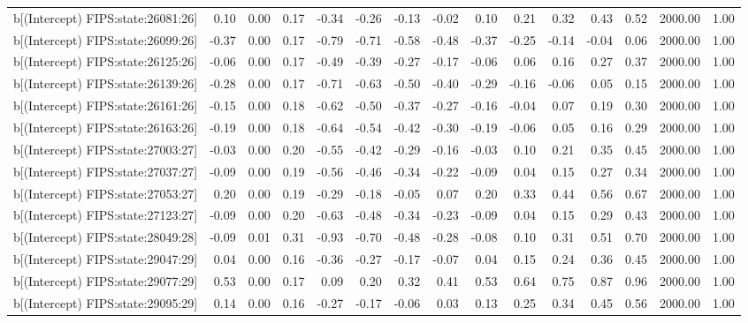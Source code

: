 \begin{table}[ht]
\begin{tabular}{rrrrrrrrrrrrrrr}
  b[(Intercept) FIPS:state:26081:26] & 0.10 & 0.00 & 0.17 & -0.34 & -0.26 & -0.13 & -0.02 & 0.10 & 0.21 & 0.32 & 0.43 & 0.52 & 2000.00 & 1.00 \\ 
  b[(Intercept) FIPS:state:26099:26] & -0.37 & 0.00 & 0.17 & -0.79 & -0.71 & -0.58 & -0.48 & -0.37 & -0.25 & -0.14 & -0.04 & 0.06 & 2000.00 & 1.00 \\ 
  b[(Intercept) FIPS:state:26125:26] & -0.06 & 0.00 & 0.17 & -0.49 & -0.39 & -0.27 & -0.17 & -0.06 & 0.06 & 0.16 & 0.27 & 0.37 & 2000.00 & 1.00 \\ 
  b[(Intercept) FIPS:state:26139:26] & -0.28 & 0.00 & 0.17 & -0.71 & -0.63 & -0.50 & -0.40 & -0.29 & -0.16 & -0.06 & 0.05 & 0.15 & 2000.00 & 1.00 \\ 
  b[(Intercept) FIPS:state:26161:26] & -0.15 & 0.00 & 0.18 & -0.62 & -0.50 & -0.37 & -0.27 & -0.16 & -0.04 & 0.07 & 0.19 & 0.30 & 2000.00 & 1.00 \\ 
  b[(Intercept) FIPS:state:26163:26] & -0.19 & 0.00 & 0.18 & -0.64 & -0.54 & -0.42 & -0.30 & -0.19 & -0.06 & 0.05 & 0.16 & 0.29 & 2000.00 & 1.00 \\ 
  b[(Intercept) FIPS:state:27003:27] & -0.03 & 0.00 & 0.20 & -0.55 & -0.42 & -0.29 & -0.16 & -0.03 & 0.10 & 0.21 & 0.35 & 0.45 & 2000.00 & 1.00 \\ 
  b[(Intercept) FIPS:state:27037:27] & -0.09 & 0.00 & 0.19 & -0.56 & -0.46 & -0.34 & -0.22 & -0.09 & 0.04 & 0.15 & 0.27 & 0.34 & 2000.00 & 1.00 \\ 
  b[(Intercept) FIPS:state:27053:27] & 0.20 & 0.00 & 0.19 & -0.29 & -0.18 & -0.05 & 0.07 & 0.20 & 0.33 & 0.44 & 0.56 & 0.67 & 2000.00 & 1.00 \\ 
  b[(Intercept) FIPS:state:27123:27] & -0.09 & 0.00 & 0.20 & -0.63 & -0.48 & -0.34 & -0.23 & -0.09 & 0.04 & 0.15 & 0.29 & 0.43 & 2000.00 & 1.00 \\ 
  b[(Intercept) FIPS:state:28049:28] & -0.09 & 0.01 & 0.31 & -0.93 & -0.70 & -0.48 & -0.28 & -0.08 & 0.10 & 0.31 & 0.51 & 0.70 & 2000.00 & 1.00 \\ 
  b[(Intercept) FIPS:state:29047:29] & 0.04 & 0.00 & 0.16 & -0.36 & -0.27 & -0.17 & -0.07 & 0.04 & 0.15 & 0.24 & 0.36 & 0.45 & 2000.00 & 1.00 \\ 
  b[(Intercept) FIPS:state:29077:29] & 0.53 & 0.00 & 0.17 & 0.09 & 0.20 & 0.32 & 0.41 & 0.53 & 0.64 & 0.75 & 0.87 & 0.96 & 2000.00 & 1.00 \\ 
  b[(Intercept) FIPS:state:29095:29] & 0.14 & 0.00 & 0.16 & -0.27 & -0.17 & -0.06 & 0.03 & 0.13 & 0.25 & 0.34 & 0.45 & 0.56 & 2000.00 & 1.00 \\ 

\end{tabular}
\end{table}
